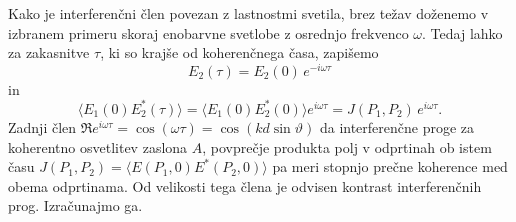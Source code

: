 Kako je interferenčni člen povezan z lastnostmi svetila, brez težav
doženemo v izbranem primeru skoraj enobarvne svetlobe z osrednjo frekvenco
$\omega$. Tedaj lahko za zakasnitve $\tau$, ki so krajše
od koherenčnega časa, zapišemo 
\begin{equation}
E_{2}(\tau)=E_{2}(0)\, e^{-i\omega\tau}
\end{equation}
 in 
\begin{equation}
\langle E_{1}(0)E_{2}^{*}(\tau)\rangle=\langle E_{1}(0)E_{2}^{*}(0)\rangle 
e^{i\omega\tau}=J(P_{1},P_{2})\, e^{i\omega\tau}.
\end{equation}
Zadnji člen $\Re e^{i\omega\tau}= \cos(\omega \tau) = \cos(kd\sin\vartheta)$ da interferenčne
proge za koherentno osvetlitev zaslona $A$, povprečje produkta polj
v odprtinah ob istem času $J(P_{1},P_{2})=\langle E(P_{1},0)E^{*}(P_{2},0)\rangle$
pa meri stopnjo prečne koherence med obema odprtinama. Od velikosti
tega člena je odvisen kontrast interferenčnih prog. Izračunajmo ga.

